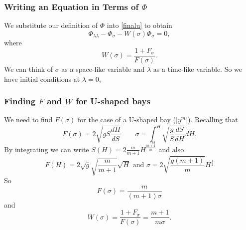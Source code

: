 	\begin{frame}
		\frametitle{Writing an Equation in Terms of $\Phi$}
		We substitute our definition of $\Phi$ into \eqref{finalu} to obtain
		\begin{equation}\label{Phieq}
			\Phi_{\lambda \lambda} - \Phi_{\sigma} - W(\sigma) \Phi_\sigma = 0,
		\end{equation}
		where
		\[
			W(\sigma) = \frac{1 + F_\sigma}{F(\sigma)}.
		\]
		We can think of $\sigma$ as a space-like variable and $\lambda$ as a time-like variable.
		So we have initial conditions at $\lambda = 0$,
	\end{frame}


\begin{frame}
	\frametitle{Finding $F$ and $W$ for U-shaped bays}
	We need to find $F(\sigma)$ for the case of a U-shaped bay ($|y^m|$). Recalling that
	\[
		F(\sigma)= 2 \sqrt{gS \frac{dH}{dS}} \qquad \sigma = \int_0^H \sqrt{\frac{g}{S} \frac{dS}{dH}}dH.
	\]
	By integrating we can write $S(H)=2\frac{m}{m+1}H^{\frac{m+1}{m}}$ and also
	\[
		F(H)=2\sqrt{g} \sqrt{\frac{m}{m+1}} \sqrt{H} \text{ and } \sigma=2\sqrt{\frac{g(m+1)}{m}} H^{\frac12}
	\]
	So
		\[ F(\sigma)=\frac{m}{(m+1)\sigma} \]
	and
		\[ W(\sigma) = \frac{1 + F_\sigma}{F(\sigma)}=\frac{m+1}{m\sigma}. \]

\end{frame}

